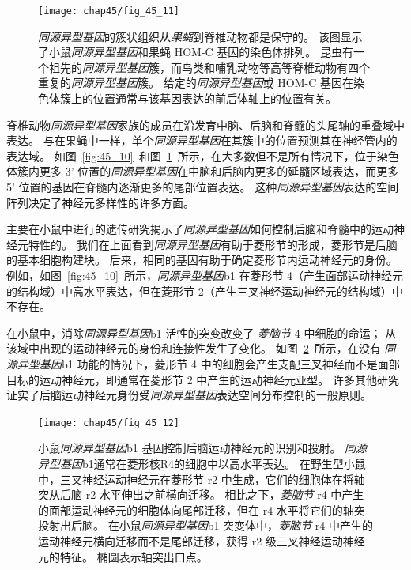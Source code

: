 \begin{figure}[htbp]
	\centering
	\texttt{[image: chap45/fig\_45\_11]}
	\caption{\textit{同源异型基因}的簇状组织从\textit{果蝇}到脊椎动物都是保守的。
		该图显示了小鼠\textit{同源异型基因}和果蝇 HOM-C 基因的染色体排列。
		昆虫有一个祖先的\textit{同源异型基因}簇，而鸟类和哺乳动物等高等脊椎动物有四个重复的\textit{同源异型基因}簇。
		给定的\textit{同源异型基因}或 HOM-C 基因在染色体簇上的位置通常与该基因表达的前后体轴上的位置有关\cite{wolpert2015principles}。 }
	\label{fig:45_11}
\end{figure}


脊椎动物\textit{同源异型基因}家族的成员在沿发育中脑、后脑和脊髓的头尾轴的重叠域中表达。
与在果蝇中一样，单个\textit{同源异型基因}在其簇中的位置预测其在神经管内的表达域。
如图~\ref{fig:45_10}~和图~\ref{fig:45_11}~所示，在大多数但不是所有情况下，位于染色体簇内更多 3' 位置的\textit{同源异型基因}在中脑和后脑内更多的延髓区域表达，而更多 5' 位置的基因在脊髓内逐渐更多的尾部位置表达。
这种\textit{同源异型基因}表达的空间阵列决定了神经元多样性的许多方面。


主要在小鼠中进行的遗传研究揭示了\textit{同源异型基因}如何控制后脑和脊髓中的运动神经元特性的。
我们在上面看到\textit{同源异型基因}有助于菱形节的形成，菱形节是后脑的基本细胞构建块。
后来，相同的基因有助于确定菱形节内运动神经元的身份。
例如，如图~\ref{fig:45_10}~所示，\textit{同源异型基因}b1 在菱形节 4（产生面部运动神经元的结构域）中高水平表达，但在菱形节 2（产生三叉神经运动神经元的结构域）中不存在。


在小鼠中，消除\textit{同源异型基因}b1 活性的突变改变了 \textit{菱脑节} 4 中细胞的命运；
从该域中出现的运动神经元的身份和连接性发生了变化。 
如图~\ref{fig:45_12}~所示，在没有 \textit{同源异型基因}b1 功能的情况下，菱形节 4 中的细胞会产生支配三叉神经而不是面部目标的运动神经元，即通常在菱形节 2 中产生的运动神经元亚型。
许多其他研究证实了后脑运动神经元身份受\textit{同源异型基因}表达空间分布控制的一般原则。


\begin{figure}[htbp]
	\centering
	\texttt{[image: chap45/fig\_45\_12]}
	\caption{小鼠\textit{同源异型基因}b1 基因控制后脑运动神经元的识别和投射。
		\textit{同源异型基因}b1通常在菱形核R4的细胞中以高水平表达。
		在野生型小鼠中，三叉神经运动神经元在菱形节 r2 中生成，它们的细胞体在将轴突从后脑 r2 水平伸出之前横向迁移。
		相比之下，\textit{菱脑节} r4 中产生的面部运动神经元的细胞体向尾部迁移，但在 r4 水平将它们的轴突投射出后脑。
		在小鼠\textit{同源异型基因}b1 突变体中，\textit{菱脑节} r4 中产生的运动神经元横向迁移而不是尾部迁移，获得 r2 级三叉神经运动神经元的特征。
		椭圆表示轴突出口点\cite{studer1996altered}。}
	\label{fig:45_12}
\end{figure}


